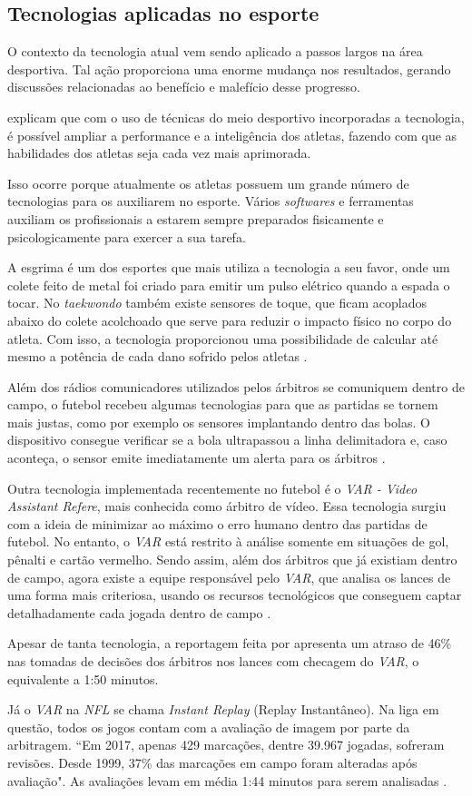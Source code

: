 \subsection{Tecnologias aplicadas no esporte}

O contexto da tecnologia atual vem sendo aplicado a passos largos na área desportiva. Tal ação proporciona uma enorme mudança nos resultados, gerando discussões relacionadas ao benefício e malefício desse progresso.

 explicam que com o uso de técnicas do meio desportivo incorporadas a tecnologia, é possível ampliar a performance e a inteligência dos atletas, fazendo com que as habilidades dos atletas seja cada vez mais aprimorada.

Isso ocorre porque atualmente os atletas possuem um grande número de tecnologias para os auxiliarem no esporte. Vários \textit{softwares} e ferramentas auxiliam os profissionais a estarem sempre preparados fisicamente e psicologicamente para exercer a sua tarefa.

A esgrima é um dos esportes que mais utiliza a tecnologia a seu favor, onde um colete feito de metal foi criado para emitir um pulso elétrico quando a espada o tocar. No \textit{taekwondo} também existe sensores de toque, que ficam acoplados abaixo do colete acolchoado que serve para reduzir o impacto físico no corpo do atleta. Com isso, a tecnologia proporcionou uma possibilidade de calcular até mesmo a potência de cada dano sofrido pelos atletas \cite{SCHATTENBERG2013}.

Além dos rádios comunicadores utilizados pelos árbitros se comuniquem dentro de campo, o futebol recebeu algumas tecnologias para que as partidas se tornem mais justas, como por exemplo os sensores implantando dentro das bolas. O dispositivo consegue verificar se a bola ultrapassou a linha delimitadora e, caso aconteça, o sensor emite imediatamente um alerta para os árbitros \cite{G12012}.

Outra tecnologia implementada recentemente no futebol é o \textit{VAR - Video Assistant Refere}, mais conhecida como árbitro de vídeo. Essa tecnologia surgiu com a ideia de minimizar ao máximo o erro humano dentro das partidas de futebol. No entanto, o \textit{VAR} está restrito à análise somente em situações de gol, pênalti e cartão vermelho. Sendo assim, além dos árbitros que já existiam dentro de campo, agora existe a equipe responsável pelo \textit{VAR}, que analisa os lances de uma forma mais criteriosa, usando os recursos tecnológicos que conseguem captar detalhadamente cada jogada dentro de campo \cite{CANALTECH2019}.

Apesar de tanta tecnologia, a reportagem feita por  apresenta um atraso de 46\% nas tomadas de decisões dos árbitros  nos lances com checagem do \textit{VAR}, o equivalente a 1:50 minutos.

Já o \textit{VAR} na \textit{NFL} se chama \textit{Instant Replay} (Replay Instantâneo). Na liga em questão, todos os jogos contam com a avaliação de imagem por parte da arbitragem. “Em 2017, apenas 429 marcações, dentre 39.967 jogadas, sofreram revisões. Desde 1999, 37\% das marcações em campo foram alteradas após avaliação". As avaliações levam em média 1:44 minutos para serem analisadas \cite{VARESPN2018}.
